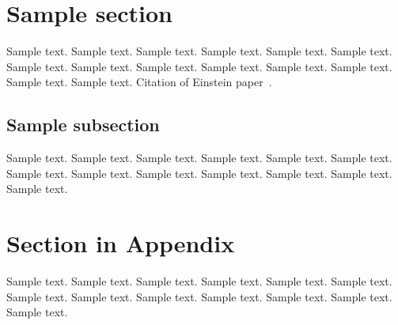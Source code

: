 \documentclass[preprint,12pt,3p]{elsarticle}
\begin{document}

\section{Sample section}
\label{sec1}

Sample text. Sample text. Sample text. Sample text. Sample text. Sample text. 
Sample text. Sample text. Sample text. Sample text. Sample text. Sample text. 
Sample text. Sample text. Citation of Einstein paper~\cite{Einstein}.

\subsection{Sample subsection}
\label{subsec1}

Sample text. Sample text. Sample text. Sample text. Sample text. Sample text. 
Sample text. Sample text. Sample text. Sample text. Sample text. Sample text. 
Sample text. 

\appendix

\section{Section in Appendix}
\label{appendix-sec1}

Sample text. Sample text. Sample text. Sample text. Sample text. Sample text. 
Sample text. Sample text. Sample text. Sample text. Sample text. Sample text. 
Sample text. 




% 
% 
% 
% 
% 
% 
% 
% 
% 
% 
% 
% 


\end{document}
